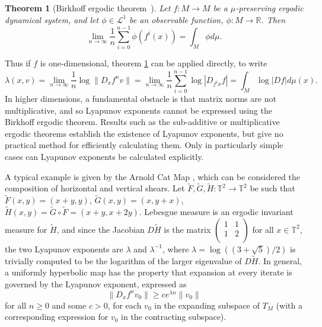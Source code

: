 \documentclass{iopart}
\newtheorem{theorem}{Theorem}
\begin{document}
\begin{theorem}[Birkhoff ergodic theorem~\cite{birkhoff1931proof}]\label{thm:birkhoff}
Let $f: M \to M$ be a $\mu$-preserving ergodic dynamical system, and let $\phi \in \mathcal{L}^1$ be an observable function, $\phi: M \to \mathbb{R}$. Then
$$
\lim_{n \to \infty} \frac{1}{n} \sum_{i=0}^{n-1} \phi (f^i (x))  = \int_M \phi d\mu.
$$
\end{theorem}
Thus if  $f$ is one-dimensional, theorem \ref{thm:birkhoff} can be applied directly, to write
$$
\lambda(x,v) = \lim_{n \to \infty}  \frac{1}{n} \log \| D_x f^n v \| = \lim_{n \to \infty} \frac{1}{n} \sum_{i=0}^{n-1} \log | D_{f^i x} f| = \int_M \log |  D f | d \mu(x).
$$
In higher dimensions, a fundamental obstacle is that matrix norms are not multiplicative, and so Lyapunov exponents cannot be expressed using the Birkhoff ergodic theorem. Results such as the sub-additive or multiplicative ergodic theorems establish the existence of Lyapunov exponents, but give no practical method for efficiently calculating them. Only in particularly simple cases can Lyapunov exponents be calculated explicitly.

A typical example is given by the Arnold Cat Map \cite{arnold1967theorie}, which can be considered the composition of horizontal and vertical shears. Let $\tilde{F}, \tilde{G}, \tilde{H}: \mathbb{T}^2 \to \mathbb{T}^2$ be such that $\tilde{F}(x,y) = (x +y,y)$, $\tilde{G}(x,y) = (x,y+x)$, $\tilde{H}(x,y) = \tilde{G} \circ \tilde{F} = (x+y,x+2y)$. Lebesgue measure is an ergodic invariant measure for $\tilde{H}$, and since the Jacobian $D\tilde{H}$ is the matrix $\left(\begin{array}{cc}
1 & 1 \\
1 & 2 \\
\end{array}\right)$ for all $x \in \mathbb{T}^2$, the two Lyapunov exponents are $\lambda$ and $\lambda^{-1}$, where $\lambda=\log ((3+\sqrt{5})/2)$ is trivially computed to be the logarithm of the larger eigenvalue of $D\tilde{H}$. In general, a uniformly hyperbolic map has the property that expansion at every iterate is governed by the Lyapunov exponent, expressed as
\begin{equation}\label{eq:uh}
\| D_x f^n v_0 \| \ge ce^{\lambda n} \| v_0 \|
\end{equation}
for all $n\ge 0$ and some $c>0$, for each $v_0$ in the expanding subspace of $T_M$ (with a corresponding expression for $v_0$ in the contracting subspace). 
\end{document}

